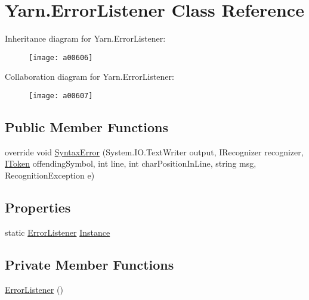 \hypertarget{a00096}{\section{Yarn.\-Error\-Listener Class Reference}
\label{a00096}
}


Inheritance diagram for Yarn.\-Error\-Listener\-:
\nopagebreak
\begin{figure}[H]
\begin{center}
\leavevmode
\texttt{[image: a00606]}
\end{center}
\end{figure}


Collaboration diagram for Yarn.\-Error\-Listener\-:
\nopagebreak
\begin{figure}[H]
\begin{center}
\leavevmode
\texttt{[image: a00607]}
\end{center}
\end{figure}
\subsection*{Public Member Functions}
\begin{DoxyCompactItemize}
\item 
override void \hyperlink{a00096_a47fb9f6d50aa6a4e4796dea10b237fe4}{Syntax\-Error} (System.\-I\-O.\-Text\-Writer output, I\-Recognizer recognizer, \hyperlink{a00294_ae3d87b0b748ea892bff48f60862e182d}{I\-Token} offending\-Symbol, int line, int char\-Position\-In\-Line, string msg, Recognition\-Exception e)
\end{DoxyCompactItemize}
\subsection*{Properties}
\begin{DoxyCompactItemize}
\item 
static \hyperlink{a00096}{Error\-Listener} \hyperlink{a00096_a47b8f4f1d414afa1ea6067218c7ee34d}{Instance}
\end{DoxyCompactItemize}
\subsection*{Private Member Functions}
\begin{DoxyCompactItemize}
\item 
\hyperlink{a00096_a1f0cc41aac10bd8a2402355534c1123c}{Error\-Listener} ()
\end{DoxyCompactItemize}
